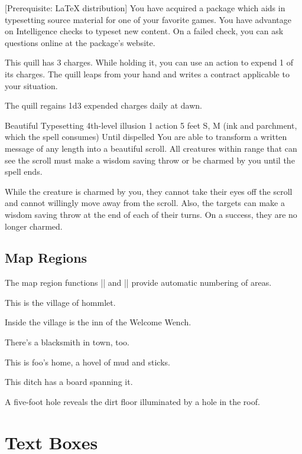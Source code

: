 \documentclass[letterpaper,twocolumn,openany,nodeprecatedcode]{dndbook}
\begin{document}
[Prerequisite: \LaTeX{} distribution]
You have acquired a package which aids in typesetting source material for one of your favorite games. You have advantage on Intelligence checks to typeset new content. On a failed check, you can ask questions online at the package's website.

This quill has 3 charges. While holding it, you can use an action to expend 1 of its charges. The quill leaps from your hand and writes a contract applicable to your situation.

The quill regains 1d3 expended charges daily at dawn.

\DndSpellHeader%
  {Beautiful Typesetting}
  {4th-level illusion}
  {1 action}
  {5 feet}
  {S, M (ink and parchment, which the spell consumes)}
  {Until dispelled}
You are able to transform a written message of any length into a beautiful scroll. All creatures within range that can see the scroll must make a wisdom saving throw or be charmed by you until the spell ends.

While the creature is charmed by you, they cannot take their eyes off the scroll and cannot willingly move away from the scroll. Also, the targets can make a wisdom saving throw at the end of each of their turns. On a success, they are no longer charmed.

\section{Map Regions}
The map region functions |\DndArea| and |\DndSubArea| provide automatic numbering of areas.

This is the village of hommlet.

Inside the village is the inn of the Welcome Wench.

There's a blacksmith in town, too.

This is foo's home, a hovel of mud and sticks.

This ditch has a board spanning it.

A five-foot hole reveals the dirt floor illuminated by a hole in the roof.

\chapter{Text Boxes}
\end{document}
